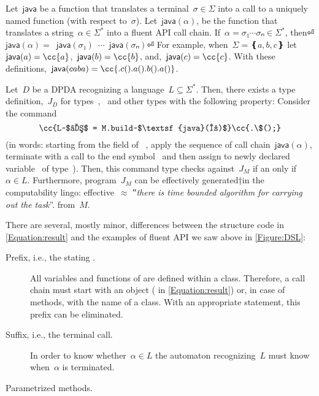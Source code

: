 Let~$\textsf{java}$ be a function that translates a terminal~$σ∈Σ$
into a call to a uniquely named function (with respect to~$σ$).
Let~$\textsf{java}(α)$, be the function
  that translates a string~$α∈Σ^*$ into a fluent API call chain.
If~$α=σ₁⋯σₙ∈Σ^*$, then⏎
  \mbox{\qquad\qquad}$\textsf{java}(α)=$~$\textsf{java}(σ₁)$~$⋯$~$\textsf{java}(σₙ)$\cc{()}⏎
For example, when~$Σ=❴a,b,c❵$ let~$\textsf{java}(a)=\cc{a}$,~$\textsf{java}(b)=\cc{b}$, and,~$\textsf{java}(c)=\cc{c}$.
With these definitions,~$\textsf{java}(caba) = \cc{.c().a().b().a()}$.

\begin{theorem}\label{Theorem:Gil-Levy}
  Let~$D$ be a DPDA recognizing a language~$L⊆Σ^*$.
  Then, there exists a \Java type definition,~$J_D$ for types~,~ and other types with the following
  property: Consider the \Java command
  \begin{equation}
    \label{Equation:result}
    \cc{L~$ℓ$ = M.build~$\textsf{java}(α)$}\cc{.\$();}
  \end{equation}
  (in words: starting from the  field  of ~,
  apply the sequence of call chain~$\textsf{java}(α)$, terminate with a call to the
  end symbol~\cc{\$()} and then assign to newly declared variable~ of type~).
  Then, this command type checks against~$J_M$ if an only if~$α∈L$.
  Furthermore, program~$J_M$ can be effectively generated†{in the computability lingo:
    effective~$≈$ ‟\emph{there is time
  bounded algorithm for carrying out the task}”.} from~$M$.
\end{theorem}

There are several, mostly minor, differences between the structure \Java code in \cref{Equation:result}
  and the examples of fluent API we saw above in \cref{Figure:DSL}:
\begin{description}
  \item[Prefix, i.e., the stating .]
    All variables and functions of \Java are defined within a class.
    Therefore, a call chain must start with an object ( in \cref{Equation:result})
      or, in case of  methods, with the name of a class.
    With an appropriate  statement, this prefix can be eliminated.
  \item[Suffix, i.e., the terminal  call.]
    In order to know whether~$α∈L$ the automaton recognizing~$L$ must
      know when~$α$ is terminated.
  \item[Parametrized methods.]
\end{description}
